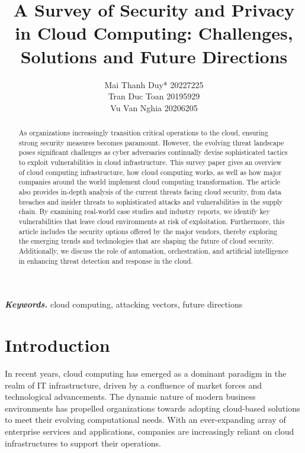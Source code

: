 \documentclass[twocolumn]{article}
\providecommand{\keywords}[1]{\textbf{\textit{Keywords.}} #1}
\let\oldmaketitle\maketitle
\renewcommand{\maketitle}{
\thispagestyle{empty}
\oldmaketitle
}
\begin{document}
\title{A Survey of Security and Privacy in Cloud Computing: Challenges, Solutions and Future Directions}
\author{
    Mai Thanh Duy{*} 20227225 \\
    Tran Duc Toan 20195929 \\
    Vu Van Nghia 20206205
}


\date{}

\maketitle
\begin{abstract}
  As organizations increasingly transition critical operations to the cloud, ensuring strong security measures becomes paramount. However, the evolving threat landscape poses significant challenges as cyber adversaries continually devise sophisticated tactics to exploit vulnerabilities in cloud infrastructure. This survey paper gives an overview of cloud computing infrastructure, how cloud computing works, as well as how major companies around the world implement cloud computing transformation. The article also provides in-depth analysis of the current threats facing cloud security, from data breaches and insider threats to sophisticated attacks and vulnerabilities in the supply chain. By examining real-world case studies and industry reports, we identify key vulnerabilities that leave cloud environments at risk of exploitation. Furthermore, this article includes the security options offered by the major vendors, thereby exploring the emerging trends and technologies that are shaping the future of cloud security. Additionally, we discuss the role of automation, orchestration, and artificial intelligence in enhancing threat detection and response in the cloud.
\end{abstract}

\keywords{cloud computing, attacking vectors, future directions}
\section{Introduction}

In recent years, cloud computing has emerged as a dominant paradigm in the realm of IT infrastructure, driven by a confluence of market forces and technological advancements. The dynamic nature of modern business environments has propelled organizations towards adopting cloud-based solutions to meet their evolving computational needs. With an ever-expanding array of enterprise services and applications, companies are increasingly reliant on cloud infrastructures to support their operations.
\end{document}
